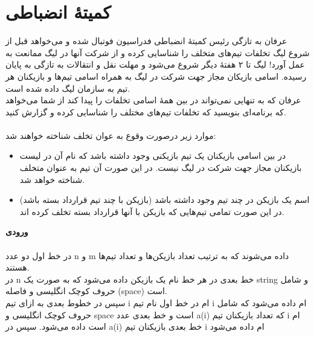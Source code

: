 \documentclass[]{article}
\begin{document}
\section{کمیتهٔ انضباطی}
عرفان به تازگی رئیس کمیتهٔ انضباطی فدراسیون فوتبال شده و می‌خواهد قبل از شروع لیگ تخلفات تیم‌های متخلف را شناسایی کرده و از شرکت آنها در لیگ ممانعت به عمل آورد! لیگ تا ۲ هفتهٔ دیگر شروع می‌شود و مهلت نقل و انتقالات به تازگی به پایان رسیده. اسامی بازیکان مجاز جهت شرکت در لیگ به همراه اسامی تیم‌ها و بازیکنان هر تیم به سازمان لیگ داده شده است.\\
عرفان که به تنهایی نمی‌تواند در بین همهٔ اسامی تخلفات را پیدا کند از شما می‌خواهد که برنامه‌ای بنویسید که تخلفات تیم‌های مختلف را شناسایی کرده و گزارش کنید.\\\\
موارد زیر درصورت وقوع به عوان تخلف شناخته خواهند شد:
\begin{itemize}[label=$\ast$]
\item 	در بین اسامی بازیکنان یک تیم بازیکنی وجود داشته باشد که نام آن در لیست بازیکنان مجاز جهت شرکت در لیگ نیست. در این صورت آن تیم به عنوان متخلف شناخته خواهد شد.
\item	 اسم یک بازیکن در چند تیم وجود داشته باشد (بازیکن با چند تیم قرارداد بسته باشد)  در این صورت تمامی تیم‌هایی که بازیکن با آنها قرارداد بسته تخلف کرده اند.\\
\end{itemize}

\textbf{ورودی}\\\\
در خط اول دو عدد n و m داده می‌شوند که به ترتیب تعداد بازیکن‌ها و تعداد تیم‌ها هستند.\\
در n خط بعدی در هر خط نام یک بازیکن داده می‌شود که به صورت یک string و شامل حروف کوچک انگلیسی و فاصله (space) است.\\
سپس در خطوط بعدی به ازای تیم i ام در خط اول نام تیم i ام داده می‌شود که شامل حروف کوچک انگلیسی و space است و خط بعدی عدد a(i) که تعداد بازیکنان تیم i ام است داده می‌شود. سپس در a(i) خط بعدی بازیکنان تیم i ام داده می‌شود\\
\end{document}
